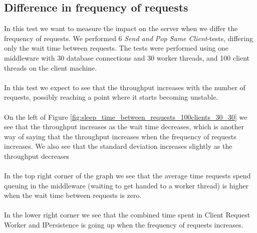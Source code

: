 \documentclass{article}
\begin{document}
        \subsection{Difference in frequency of requests}
            \label{sec:difference_in_frequency_of_requests}
            In this test we want to measure the impact on the server when we differ the frequency of requests. We performed 6 \textit{Send and Pop Same Client}-tests, differing only the wait time between requests. The tests were performed using one middleware with 30 database connections and 30 worker threads, and 100 client threads on the client machine.\\
            \\
            In this test we expect to see that the throughput increases with the number of requests, possibly reaching a point where it starts becoming unstable.\\
            \\
            On the left of Figure \ref{fig:sleep_time_between_requests_100clients_30_30} we see that the throughput increases as the wait time decreases, which is another way of saying that the throughput increases when the frequency of requests increases. We also see that the standard deviation increases slightly as the throughput decreases\\
            \\
            In the top right corner of the graph we see that the average time requests spend queuing in the middleware (waiting to get handed to a worker thread) is higher when the wait time between requests is zero.\\
            \\
            In the lower right corner we see that the combined time spent in Client Request Worker and IPersistence is going up when the frequency of requests increases.
\end{document}
